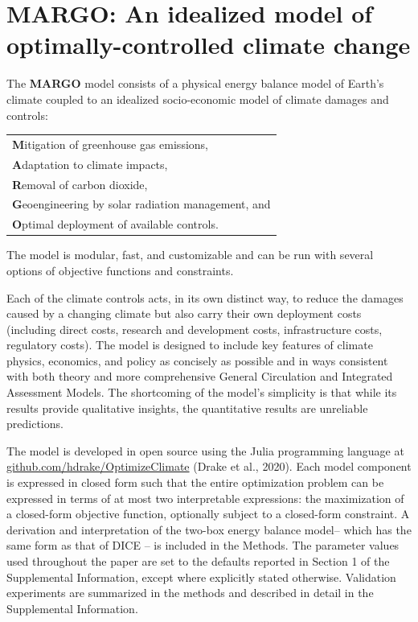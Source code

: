 \documentclass[9pt,twocolumn,twoside,lineno]{pnas-new}
\begin{document}
\section*{MARGO: An idealized model of optimally-controlled climate change}

The \textbf{MARGO} model consists of a physical energy balance model of Earth's climate coupled to an idealized socio-economic model of climate damages and controls:
\begin{center}
\begin{tabular}{l}
\textbf{M}itigation of greenhouse gas emissions, \\
\textbf{A}daptation to climate impacts, \\
\textbf{R}emoval of carbon dioxide, \\
\textbf{G}eoengineering by solar radiation management, and\\
\textbf{O}ptimal deployment of available controls.
\end{tabular}
\end{center}
The model is modular, fast, and customizable and can be run with several options of objective functions and constraints.

Each of the climate controls acts, in its own distinct way, to reduce the damages caused by a changing climate but also carry their own deployment costs (including direct costs, research and development costs, infrastructure costs, regulatory costs). The model is designed to include key features of climate physics, economics, and policy as concisely as possible and in ways consistent with both theory and more comprehensive General Circulation and Integrated Assessment Models. The shortcoming of the model's simplicity is that while its results provide qualitative insights, the quantitative results are unreliable predictions.

The model is developed in open source using the Julia programming language \cite{bezanson_julia:_2017} at \url{github.com/hdrake/OptimizeClimate} (Drake et al., 2020). Each model component is expressed in closed form such that the entire optimization problem can be expressed in terms of at most two interpretable expressions: the maximization of a closed-form objective function, optionally subject to a closed-form constraint. A derivation and interpretation of the two-box energy balance model– which has the same form as that of DICE \cite{nordhaus2013dice}– is included in the Methods. The parameter values used throughout the paper are set to the defaults reported in Section 1 of the Supplemental Information, except where explicitly stated otherwise. Validation experiments are summarized in the methods and described in detail in the Supplemental Information.
\end{document}
